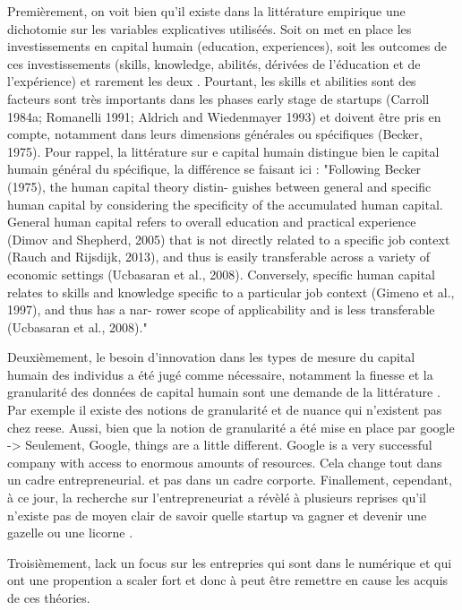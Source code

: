 \documentclass[11pt]{article}
\begin{document}
Premièrement, on voit bien qu'il existe dans la littérature empirique une dichotomie sur les variables explicatives utiliséés. Soit on met en place les investissements en capital humain (education, experiences), soit les outcomes de ces investissements (skills, knowledge, abilités, dérivées de l'éducation et de l'expérience) et rarement les deux \citet{becker1964human, unger2011human, marvel2016human, reese2020should}. Pourtant, les skills et abilities sont des facteurs sont très importants dans les phases early stage de startups (Carroll 1984a; Romanelli 1991; Aldrich and Wiedenmayer 1993) et doivent être pris en compte, notamment dans leurs dimensions générales ou spécifiques (Becker, 1975). Pour rappel, la littérature sur e capital humain distingue bien le capital humain général du spécifique, la différence se faisant ici :
"Following Becker (1975), the human capital theory distin- guishes between general and specific human capital by considering the specificity of the accumulated human capital. General human capital refers to overall education and practical experience (Dimov and Shepherd, 2005) that is not directly related to a specific job context (Rauch and Rijsdijk, 2013), and thus is easily transferable across a variety of economic settings (Ucbasaran et al., 2008). Conversely, specific human capital relates to skills and knowledge specific to a particular job context (Gimeno et al., 1997), and thus has a nar- rower scope of applicability and is less transferable (Ucbasaran et al., 2008)."

Deuxièmement, le besoin d'innovation dans les types de mesure du capital humain des individus a été jugé comme nécessaire, notamment la finesse et la granularité des données de capital humain sont une demande de la littérature \citep{marvel2016human}. Par exemple il existe des notions de granularité et de nuance qui n'existent pas chez reese. Aussi, bien que la notion de granularité a été mise en place par google -> Seulement, Google, things are a little different. Google is a very successful company with access to enormous amounts of resources. Cela change tout dans un cadre entrepreneurial. et pas dans un cadre corporte. Finallement, cependant, à ce jour, la recherche sur l'entrepreneuriat a révèlé à plusieurs reprises qu'il n'existe pas de moyen clair de savoir quelle startup va gagner et devenir une gazelle ou une licorne \citep{aldrich2018unicorns}.

Troisièmement, lack un focus sur les entrepries qui sont dans le numérique et qui ont une propention a scaler fort et donc à peut être remettre en cause les acquis de ces théories.
\end{document}
